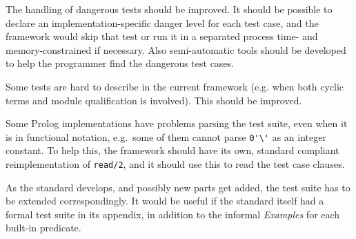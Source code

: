 \documentclass[draft]{llncs}%
\newif\ifDraft \Draftfalse
\begin{document}
The handling of dangerous tests should be improved. It should be possible to
declare an implementation-specific danger level for
each test case, and the framework would skip that test or run it in a
separated process time- and memory-constrained if necessary. Also
semi-automatic tools should be developed to help the programmer find the
dangerous test cases.

Some tests are hard to describe in the current framework (e.g. when both
cyclic terms and module qualification is involved). This should be improved.

Some Prolog implementations have problems parsing the test suite, even when
it is in functional notation, e.g.\ some of them cannot parse
\verb+0'\'+ as an integer constant. To help this, the framework should have
its own, standard compliant reimplementation of \verb+read/2+, and it should
use this to read the test case clauses.

As the standard develops, and possibly new parts get added, the test suite
has to be extended correspondingly. It would be useful if the standard itself
had a formal test suite in its appendix, in addition to the informal
\emph{Examples} for each built-in predicate.


\nocite{isoprolog95}
\nocite{isoprologbook}
\nocite{sicstus-manual}
\nocite{diaz00gnu}
\nocite{DBLP:conf_sac_DiazC00}
\nocite{Wielemaker:03b}
\nocite{swipl-manual}
\nocite{ciao-manual}
\nocite{yap-manual}
\nocite{seriously}
\nocite{validation} %
\nocite{executable}

\ifDraft
  
  
\else
\end{document}
